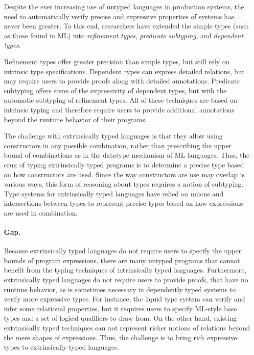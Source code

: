 \documentclass[acmsmall]{acmart}
\theoremstyle{definition}
\begin{document}
Despite the ever increasing use of untyped languages in production systems, 
the need to automatically verify precise and expressive properties of systems has never been greater.
To this end, researchers have extended the simple types (such as those found in ML) into 
\textit{refinement types}, \textit{predicate subtyping}, and \textit{dependent types}. 

Refinement types offer greater precision than simple types, but still rely on intrinsic type specifications.
Dependent types can express detailed relations, but may require users to provide proofs along with detailed annotations.
Predicate subtyping offers some of the expressivity of dependent types, but with the automatic subtyping of refinement types.
All of these techniques are based on intrinsic typing and therefore require users to provide additional annotations
beyond the runtime behavior of their programs.

The challenge with extrinsically typed languages is that they allow using constructors
in any possible combination, rather than prescribing the upper bound of combinations as in
the datatype mechanism of ML languages. Thus, the crux of typing extrinsically typed programs is
to determine a precise type based on how constructors are used. 
Since the way constructors are use may overlap is various ways, this form of reasoning about types
requires a notion of subtyping.
Type systems for extrinsically typed languages have relied on unions and intersections between types to 
represent precise types based on how expressions are used in combination. 

\paragraph{Gap.} 
Because extrinsically typed languages do not require users to specify the upper bounds of program expressions,
there are many untyped programs that cannot benefit from the typing techniques of 
intrinsically typed languages. Furthermore, extrinsically typed languages do not require users to provide proofs,
that have no runtime behavior, as is sometimes necessary in dependently typed systems to verify more expressive types.   
For instance, the liquid type system \cite{} can verify and infer some relational properties, 
but it requires users to specify ML-style base types and a set of logical qualifiers to draw from.
On the other hand, existing extrinsically typed techniques can not represent richer notions of relations 
beyond the mere shapes of expressions.
Thus, the challenge is to bring rich expressive types to extrinsically typed languages.
\end{document}
